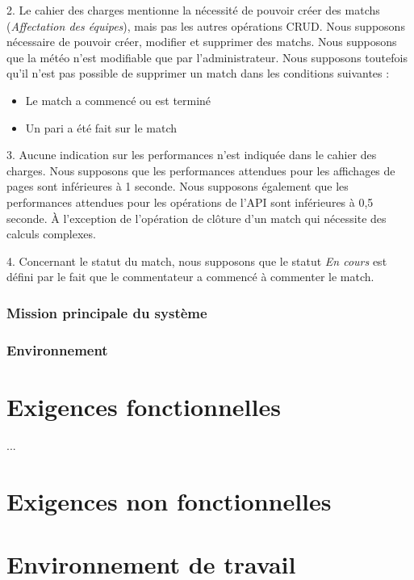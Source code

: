 \documentclass{book}
\begin{document}
2. Le cahier des charges mentionne la nécessité de pouvoir créer des matchs (\textit{Affectation des équipes}), mais pas les autres opérations CRUD.
Nous supposons nécessaire de pouvoir créer, modifier et supprimer des matchs.
Nous supposons que la météo n'est modifiable que par l'administrateur.
Nous supposons toutefois qu'il n'est pas possible de supprimer un match dans les conditions suivantes :
\begin{itemize}
    \item Le match a commencé ou est terminé
    \item Un pari a été fait sur le match
\end{itemize}

3. Aucune indication sur les performances n'est indiquée dans le cahier des charges. Nous supposons que les performances
attendues pour les affichages de pages sont inférieures à 1 seconde. Nous supposons également que les performances attendues
pour les opérations de l'API sont inférieures à 0,5 seconde. À l'exception de l'opération de clôture d'un match qui nécessite
des calculs complexes.

4. Concernant le statut du match, nous supposons que le statut \textit{En cours} est défini par le fait que le commentateur a commencé à commenter le match.

\subsection{Mission principale du système}

\subsection{Environnement}

\chapter{Exigences fonctionnelles}

\begin{landscape}
  
  ...


\end{landscape}

\chapter{Exigences non fonctionnelles}


\chapter{Environnement de travail}
\end{document}
